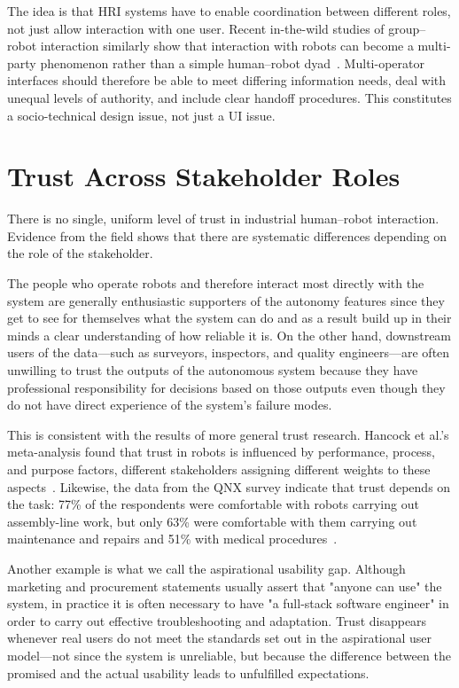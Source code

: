 \documentclass[sigconf, nonacm] {acmart}
\begin{document}
The idea is that HRI systems have to enable coordination between different
roles, not just allow interaction with one user. Recent in-the-wild studies
of group--robot interaction similarly show that interaction with robots can
become a multi-party phenomenon rather than a simple human--robot dyad~\cite{zibetti2026field}. Multi-operator interfaces should therefore
be able to meet differing information needs, deal with unequal levels of
authority, and include clear handoff procedures. This constitutes a
socio-technical design issue, not just a UI issue.





\section{Trust Across Stakeholder Roles}
There is no single, uniform level of trust in industrial human–robot interaction. Evidence from the field shows that there are systematic differences depending on the role of the stakeholder.

The people who operate robots and therefore interact most directly with the system are generally enthusiastic supporters of the autonomy features since they get to see for themselves what the system can do and as a result build up in their minds a clear understanding of how reliable it is. On the other hand, downstream users of the data—such as surveyors, inspectors, and quality engineers—are often unwilling to trust the outputs of the autonomous system because they have professional responsibility for decisions based on those outputs even though they do not have direct experience of the system's failure modes.

This is consistent with the results of more general trust research. Hancock et al.'s meta-analysis found that trust in robots is influenced by performance, process, and purpose factors, different stakeholders assigning different weights to these aspects~\cite{hancock2021evolving}. Likewise, the data from the QNX survey indicate that trust depends on the task: 77\% of the respondents were comfortable with robots carrying out assembly-line work, but only 63\% were comfortable with them carrying out maintenance and repairs and 51\% with medical procedures~\cite{qnx2025study}.

Another example is what we call the aspirational usability gap. Although marketing and procurement statements usually assert that "anyone can use" the system, in practice it is often necessary to have "a full-stack software engineer" in order to carry out effective troubleshooting and adaptation. Trust disappears whenever real users do not meet the standards set out in the aspirational user model—not since the system is unreliable, but because the difference between the promised and the actual usability leads to unfulfilled expectations.
\end{document}
